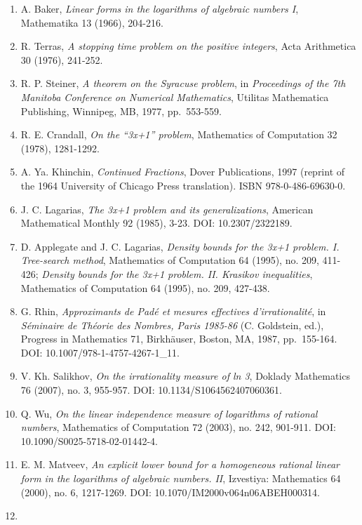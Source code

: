\documentclass[
  11pt]{amsart}
\providecommand{\tightlist}{%
  \setlength{\itemsep}{0pt}\setlength{\parskip}{0pt}}
\theoremstyle{plain}
\theoremstyle{definition}
\theoremstyle{remark}
\begin{document}
\begin{enumerate}
\def\labelenumi{\arabic{enumi}.}
\tightlist
\item
  A. Baker, \emph{Linear forms in the logarithms of algebraic numbers
  I}, Mathematika 13 (1966), 204-216.
\item
  R. Terras, \emph{A stopping time problem on the positive integers},
  Acta Arithmetica 30 (1976), 241-252.
\item
  R. P. Steiner, \emph{A theorem on the Syracuse problem}, in
  \emph{Proceedings of the 7th Manitoba Conference on Numerical
  Mathematics}, Utilitas Mathematica Publishing, Winnipeg, MB, 1977,
  pp.~553-559.
\item
  R. E. Crandall, \emph{On the ``3x+1'' problem}, Mathematics of
  Computation 32 (1978), 1281-1292.
\item
  A. Ya. Khinchin, \emph{Continued Fractions}, Dover Publications, 1997
  (reprint of the 1964 University of Chicago Press translation). ISBN
  978-0-486-69630-0.
\item
  J. C. Lagarias, \emph{The 3x+1 problem and its generalizations},
  American Mathematical Monthly 92 (1985), 3-23. DOI: 10.2307/2322189.
\item
  D. Applegate and J. C. Lagarias, \emph{Density bounds for the 3x+1
  problem. I. Tree-search method}, Mathematics of Computation 64 (1995),
  no. 209, 411-426; \emph{Density bounds for the 3x+1 problem. II.
  Krasikov inequalities}, Mathematics of Computation 64 (1995), no. 209,
  427-438.
\item
  G. Rhin, \emph{Approximants de Padé et mesures effectives
  d'irrationalité}, in \emph{Séminaire de Théorie des Nombres, Paris
  1985-86} (C. Goldstein, ed.), Progress in Mathematics 71, Birkhäuser,
  Boston, MA, 1987, pp.~155-164. DOI: 10.1007/978-1-4757-4267-1\_11.
\item
  V. Kh. Salikhov, \emph{On the irrationality measure of ln 3}, Doklady
  Mathematics 76 (2007), no. 3, 955-957. DOI: 10.1134/S1064562407060361.
\item
  Q. Wu, \emph{On the linear independence measure of logarithms of
  rational numbers}, Mathematics of Computation 72 (2003), no. 242,
  901-911. DOI: 10.1090/S0025-5718-02-01442-4.
\item
  E. M. Matveev, \emph{An explicit lower bound for a homogeneous
  rational linear form in the logarithms of algebraic numbers. II},
  Izvestiya: Mathematics 64 (2000), no. 6, 1217-1269. DOI:
  10.1070/IM2000v064n06ABEH000314.
\item

\end{enumerate}
\end{document}
